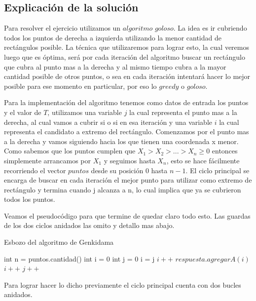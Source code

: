 \subsection{Explicación de la solución}

Para resolver el ejercicio utilizamos un $algoritmo$ $goloso$. La idea es ir cubriendo todos los puntos de derecha a izquierda utilizando la menor cantidad de rectángulos posible. La técnica que utilizaremos para lograr esto, la cual veremos luego que es óptima, será por cada iteración del algoritmo buscar un rectángulo que cubra al punto mas a la derecha y al mismo tiempo cubra a la mayor cantidad posible de otros puntos, o sea en cada iteración intentará hacer lo mejor posible para ese momento en particular, por eso lo $greedy$ o $goloso$.

Para la implementación del algoritmo tenemos como datos de entrada los puntos y el valor de $T$, utilizamos una variable $j$ la cual representa el punto mas a la derecha, al cual vamos a cubrir si o si en esa iteración y una variable $i$ la cual representa el candidato a extremo del rectángulo. Comenzamos por el punto mas a la derecha y vamos siguiendo hacia los que tienen una coordenada x menor. Como sabemos que los puntos cumplen que $X_1 > X_2 > ... > X_n \geq 0$ entonces simplemente arrancamos por $X_1$ y seguimos hasta $X_n$, esto se hace fácilmente recorriendo el vector $puntos$ desde su posición $0$ hasta $n-1$. El ciclo principal se encarga de buscar en cada iteración el mejor punto para utilizar como extremo de rectángulo y termina cuando j alcanza a n, lo cual implica que ya se cubrieron todos los puntos.

Veamos el pseudocódigo para que termine de quedar claro todo esto. Las guardas de los dos ciclos anidados las omito y detallo mas abajo.

\begin{algorithm}[H]
\begin{algorithmic}
\caption{Esbozo del algoritmo de Genkidama}
	\State int n = puntos.cantidad()
	\State int i = 0
	\State int j = 0
    		\State i = j
			\State $ i++ $
	  	\EndWhile
		\State $respuesta.agregarA(i)$
		\State $ i++ $
			\State $ j++ $
	 	\EndWhile
  \EndWhile
  \EndProcedure
\end{algorithmic}
\end{algorithm}

Para lograr hacer lo dicho previamente el ciclo principal cuenta con dos bucles anidados.

